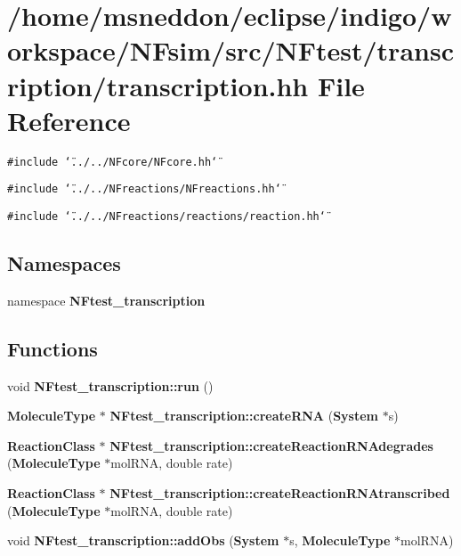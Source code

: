 \section{/home/msneddon/eclipse/indigo/workspace/NFsim/src/NFtest/transcription/transcription.hh File Reference}
\label{transcription_8hh}


{\tt \#include \char`\"{}../../NFcore/NFcore.hh\char`\"{}}\par
{\tt \#include \char`\"{}../../NFreactions/NFreactions.hh\char`\"{}}\par
{\tt \#include \char`\"{}../../NFreactions/reactions/reaction.hh\char`\"{}}\par
\subsection*{Namespaces}
\begin{CompactItemize}
\item 
namespace {\bf NFtest\_\-transcription}
\end{CompactItemize}
\subsection*{Functions}
\begin{CompactItemize}
\item 
void {\bf NFtest\_\-transcription::run} ()
\item 
{\bf MoleculeType} $\ast$ {\bf NFtest\_\-transcription::createRNA} ({\bf System} $\ast$s)
\item 
{\bf ReactionClass} $\ast$ {\bf NFtest\_\-transcription::createReactionRNAdegrades} ({\bf MoleculeType} $\ast$molRNA, double rate)
\item 
{\bf ReactionClass} $\ast$ {\bf NFtest\_\-transcription::createReactionRNAtranscribed} ({\bf MoleculeType} $\ast$molRNA, double rate)
\item 
void {\bf NFtest\_\-transcription::addObs} ({\bf System} $\ast$s, {\bf MoleculeType} $\ast$molRNA)
\end{CompactItemize}
